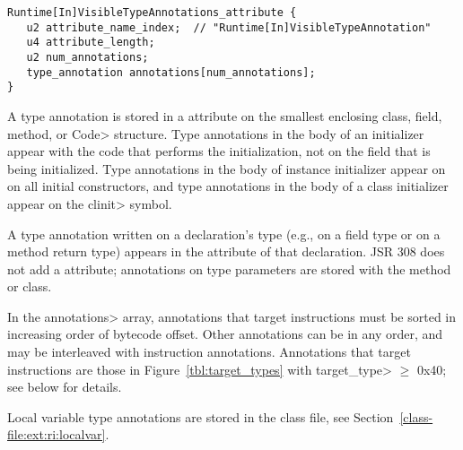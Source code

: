 \documentclass[10pt]{article}
\newcommand{\preverbnegspace}{\vspace{-5pt}}
\begin{document}
\preverbnegspace
\begin{Verbatim}
Runtime[In]VisibleTypeAnnotations_attribute {
   u2 attribute_name_index;  // "Runtime[In]VisibleTypeAnnotation"
   u4 attribute_length;
   u2 num_annotations;
   type_annotation annotations[num_annotations];
}
\end{Verbatim}


A type annotation is stored in a \RuntimeInOrVisibleTypeAnnotations attribute
on the smallest enclosing class, field, method, or \<Code> structure.
Type annotations in the body of an initializer appear with the code that
performs the initialization, not on the field that is being initialized.
Type annotations in the body of instance initializer appear on on all
initial constructors, and type annotations in the body of a class
initializer appear on the \<clinit> symbol.


A type annotation written on a declaration's type (e.g., on a field type or
on a method return type)
appears in the \RuntimeInOrVisibleTypeAnnotations attribute of that declaration.
JSR 308 does not add a \RuntimeInOrVisibleTypeParameterAnnotations
attribute; annotations on type parameters are stored with the method or class.



In the \<annotations> array, annotations that target instructions must be
sorted in increasing order of bytecode offset.  Other annotations can be in
any order, and may be interleaved with instruction annotations.
Annotations that target instructions are those in
Figure~\ref{tbl:target_types} with \<target\_type> $\ge$ 0x40; see below
for details.

Local variable type annotations are stored in the class file, see
Section~\ref{class-file:ext:ri:localvar}.
\end{document}
